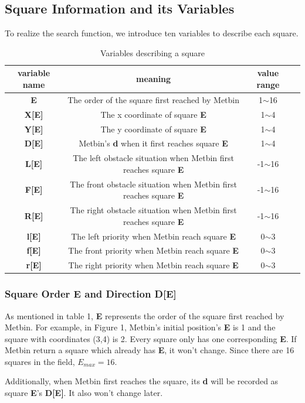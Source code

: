 \documentclass[12pt]{article}
\begin{document}
\subsection{Square Information and its Variables}
To realize the search function, we introduce ten variables to describe each square.
\begin{table}[H]
\centering
\begin{tabular}{|c|c|c|c|}
\hline
variable name & meaning  & value range  \\ \hline
\textbf{E} &The order of the square first reached by Metbin  & 1$\sim$16   \\ \hline
\textbf{X[E]} &The x coordinate of square \textbf{E}  &  1$\sim$4  \\ \hline
\textbf{Y[E]} &The y coordinate of square \textbf{E}  &  1$\sim$4  \\ \hline
\textbf{D[E]} &Metbin's \textbf{d} when it first reaches square \textbf{E}  &1$\sim$4    \\ \hline
\textbf{L[E]} &The left obstacle situation when Metbin first reaches square \textbf{E}  &-1$\sim$16  \\ \hline
\textbf{F[E]} &The front obstacle situation when Metbin first reaches square \textbf{E}  &-1$\sim$16     \\ \hline
\textbf{R[E]} &The right obstacle situation when Metbin first reaches square \textbf{E}  &-1$\sim$16     \\ \hline
\textbf{l[E]} &The left priority when Metbin reach square \textbf{E}  &0$\sim$3     \\ \hline
\textbf{f[E]} &The front priority when Metbin reach square \textbf{E}  &0$\sim$3     \\ \hline
\textbf{r[E]} &The right priority when Metbin reach square \textbf{E}  &0$\sim$3    \\ \hline
\end{tabular}
\caption{Variables describing a square}
\end{table}
\subsubsection{Square Order \textbf{E} and Direction \textbf{D[E]}}
As mentioned in table 1, \textbf{E} represents the order of the square first reached by Metbin. For example, in Figure 1, Metbin's initial position's \textbf{E} is 1 and the square with coordinates (3,4) is 2. Every square only has one corresponding \textbf{E}. If Metbin return a square which already has \textbf{E}, it won't change. Since there are 16 squares in the field, $E_{max}=16$.
\par Additionally, when Metbin first reaches the square, its \textbf{d} will be recorded as square \textbf{E}'s \textbf{D[E]}. It also won't change later.  
\end{document}
